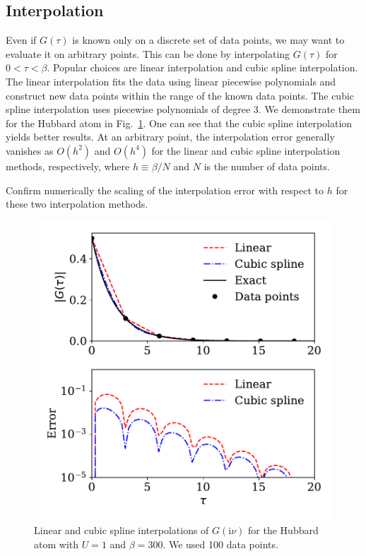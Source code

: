 \documentclass[submission, LectureNotes]{SciPost}
\newcommand\ii{\mathrm{i}}%
\newcommand\iv{\ii\nu}%
\begin{document}
\subsection{Interpolation}
Even if $G(\tau)$ is known only on a discrete set of data points,
we may want to evaluate it on arbitrary points.
This can be done by interpolating $G(\tau)$ for $0 < \tau < \beta$.
Popular choices are linear interpolation and cubic spline interpolation.
The linear interpolation fits the data using linear piecewise polynomials
and construct new data points within the range of the known data points.
The cubic spline interpolation uses piecewise polynomials of degree 3.
We demonstrate them for the Hubbard atom in Fig.~\ref{fig:interpolation-gtau}.
One can see that the cubic spline interpolation yields better results.
At an arbitrary point, the interpolation error generally vanishes as $O(h^2)$ and $O(h^4)$
for the linear and cubic spline interpolation methods, respectively,
where $h\equiv \beta/N$ and $N$ is the number of data points.

\begin{Exercise}
    Confirm numerically the scaling of the interpolation error 
    with respect to $h$ for these two interpolation methods.
\end{Exercise}

\begin{figure}
    \centering
    \includegraphics[width=0.8\columnwidth]{interpolation_gtau.pdf}
    \caption{
        Linear and cubic spline interpolations of $G(\iv)$ for the Hubbard atom with $U=1$ and $\beta=300$.
        We used 100 data points.
        }
    \label{fig:interpolation-gtau}
\end{figure}
\end{document}
